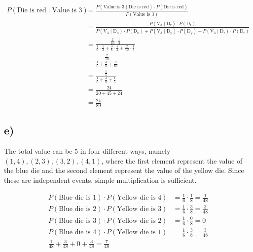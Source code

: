 \documentclass[12pt]{article}
\begin{document}
\begin{align*}
    P(\text{Die is red} \mid \text{Value is 3})
        &= \frac{P(\text{Value is 3} \mid \text{Die is red})
                    \cdot P(\text{Die is red})}
                {P(\text{Value is 3})} \\[1.5ex]
        &= \frac{P(\text{V}_3 \mid \text{D}_\text{r})
                    \cdot P(\text{D}_\text{r})}
                {P(\text{V}_3 \mid \text{D}_\text{b})
                    \cdot P(\text{D}_\text{b}) +
                 P(\text{V}_3 \mid \text{D}_\text{y})
                    \cdot P(\text{D}_\text{y}) +
                 P(\text{V}_3 \mid \text{D}_\text{r})
                    \cdot P(\text{D}_\text{r})} \\[1.5ex]
        &= \frac{\tfrac{2}{10} \cdot \tfrac{1}{3}}
                {\tfrac{1}{6} \cdot \tfrac{1}{3}
                + \tfrac{3}{8} \cdot \tfrac{1}{3}
                + \tfrac{2}{10} \cdot \tfrac{1}{3}} \\[1.5ex]
        &= \frac{\tfrac{2}{10}}
                {\tfrac{1}{6} + \tfrac{3}{8} + \tfrac{2}{10}} \\[1.5ex]
        &= \frac{\tfrac{1}{5}}
                {\tfrac{1}{6} + \tfrac{3}{8} + \tfrac{1}{5}} \\[1.5ex]
        &= \frac{24}{20 + 45 + 24} \\[1.5ex]
        &= \frac{24}{89}
\end{align*}

\subsection*{e)} 

The total value can be 5 in four different ways, namely $(1, 4), (2, 3), (3, 2),
(4, 1)$, where the first element represent the value of the blue die and the
second element represent the value of the yellow die.
Since these are independent events, simple multiplication is sufficient.

\begin{align*}
    P(\text{Blue die is 1}) \cdot P(\text{Yellow die is 4})
        &= \tfrac{1}{6} \cdot \tfrac{1}{8} = \tfrac{1}{48} \\[0.5ex]
    P(\text{Blue die is 2}) \cdot P(\text{Yellow die is 3})
        &= \tfrac{1}{6} \cdot \tfrac{3}{8} = \tfrac{3}{48} \\[0.5ex]
    P(\text{Blue die is 3}) \cdot P(\text{Yellow die is 2})
        &= \tfrac{1}{6} \cdot \tfrac{0}{8} = 0 \\[0.5ex]
    P(\text{Blue die is 4}) \cdot P(\text{Yellow die is 1})
        &= \tfrac{1}{6} \cdot \tfrac{3}{8} = \tfrac{3}{48} \\[0.5ex]
    \frac{1}{48} + \frac{3}{48} + 0 + \frac{3}{48} = \frac{7}{48}
\end{align*}
\end{document}
